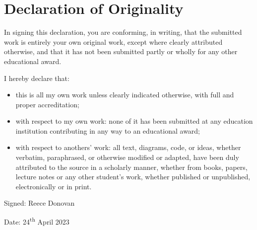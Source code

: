 \chapter*{Declaration of Originality}
\vspace*{\fill}
\vspace*{1cm}
In signing this declaration, you are conforming, in writing, that the submitted work is entirely your own original work, except where clearly attributed otherwise, and that it has not been submitted partly or wholly for any other educational award.

\vspace{1cm}
I hereby declare that:
\begin{itemize}
    \item this is all my own work unless clearly indicated otherwise, with full and proper accreditation;
    \item with respect to my own work: none of it has been submitted at any education institution contributing in any way to an educational award;
    \item with respect to anothers' work: all text, diagrams, code, or ideas, whether verbatim, paraphrased, or otherwise modified or adapted, have been duly attributed to the source in a scholarly manner, whether from books, papers, lecture notes or any other student's work, whether published or unpublished, electronically or in print.
\end{itemize}

\vspace{1cm}
\begin{center}
    \hspace*{0.5cm}
    Signed: {Reece Donovan}
    \vspace{0.5cm}

    Date: 24\textsuperscript{th} April 2023
\end{center}
\vspace*{\fill}